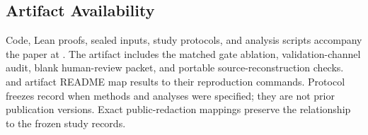 \begin{samepage}
\section*{Artifact Availability}

Code, Lean proofs, sealed inputs, study protocols, and analysis scripts accompany the paper at \artifactrepo. The artifact includes the matched gate ablation, validation-channel audit, blank human-review packet, and portable source-reconstruction checks.  and artifact README map results to their reproduction commands. Protocol freezes record when methods and analyses were specified; they are not prior publication versions. Exact public-redaction mappings preserve the relationship to the frozen study records.
\end{samepage}
